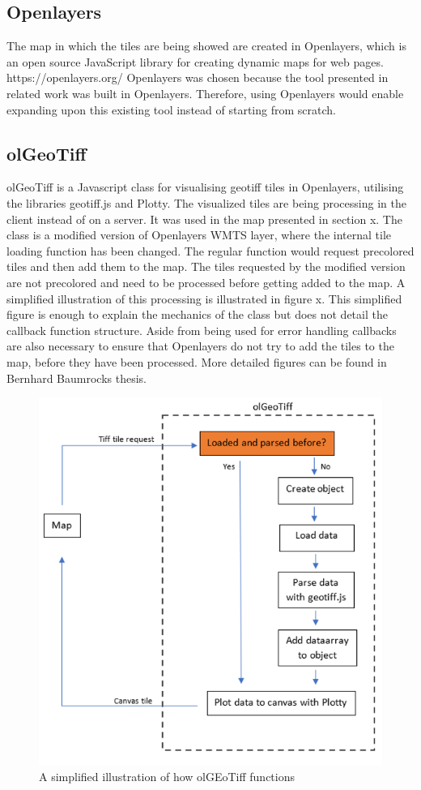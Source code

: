 \subsection*{Openlayers}
The map in which the tiles are being showed are created in Openlayers, which is an open source JavaScript library for creating dynamic maps for web pages. 
https://openlayers.org/
Openlayers was chosen because the tool presented in related work was built in Openlayers. Therefore, using Openlayers would enable expanding upon this existing tool instead of starting from scratch. 

\subsection*{olGeoTiff}
olGeoTiff is a Javascript class for visualising geotiff tiles in Openlayers, utilising the libraries geotiff.js and Plotty. The visualized tiles are being processing in the client instead of on a server. It was used in the map presented in section x. 
The class is a modified version of Openlayers WMTS layer, where the internal tile loading function has been changed. The regular function would request precolored tiles and then add them to the map. The tiles requested by the modified version are not precolored and need to be processed before getting added to the map. A simplified illustration of this processing is illustrated in figure x. This simplified figure is enough to explain the mechanics of the class but does not detail the callback function structure. Aside from being used for error handling callbacks are also necessary to ensure that Openlayers do not try to add the tiles to the map, before they have been processed. More detailed figures can be found in Bernhard Baumrocks thesis.

\begin{figure} [H]
	\centering
	\includegraphics[width=.8\textwidth]{Pictures/olGeoTiffSimplified}
	\caption{A simplified illustration of how olGEoTiff functions}
	\label{olGeoTiffSimplified}
\end{figure}

